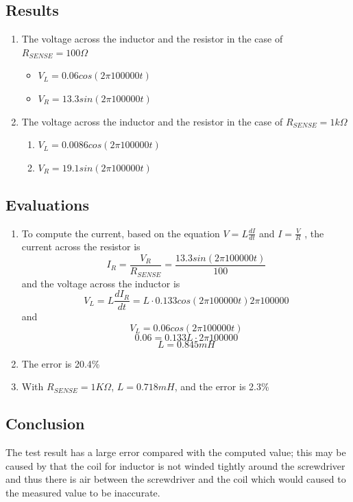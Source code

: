 \documentclass[journal, letterpaper]{IEEEtran}
\begin{document}
    \subsection{Results}
    	\begin{enumerate}
    	\item The voltage across the inductor and the resistor in the case of $R_{SENSE}=100\Omega$
    				\begin{itemize}
    				\item $V_L = 0.06cos(2\pi100000t)$
    				\item $V_R = 13.3sin(2\pi100000t)$
                    \end{itemize}
\item The voltage across the inductor and the resistor in the case of $R_{SENSE} = 1k\Omega$
		\begin{enumerate}
		\item $V_L = 0.0086cos(2\pi100000t)$
\item $V_R = 19.1sin(2\pi100000t)$
		\end{enumerate}
    \end{enumerate}

    \subsection{Evaluations}
    \begin{enumerate}
    \item To compute the current, based on the equation $V = L\frac{dI}{dt}$ and $I = \frac{V}{R}$ , the current across the resistor is $$I_R = \frac{V_R}{R_{SENSE}} = \frac{13.3sin(2\pi100000t)}{100}$$ and the voltage across the inductor is $$V_L = L\frac{dI_R}{dt} = L\cdot0.133cos(2\pi100000t)2\pi100000$$ and $$V_L = 0.06cos(2\pi100000t)$$ $$0.06 = 0.133L\cdot2\pi100000$$$$L = 0.845mH$$
\item The error is 20.4\%
\item With $R_{SENSE} = 1K\Omega$, $L = 0.718mH$, and the error is 2.3\%

    \end{enumerate}
    \subsection{Conclusion}
    The test result has a large error compared with the computed value; this may be caused by that the coil for inductor is not winded tightly around the screwdriver and thus there is air between the screwdriver and the coil which would caused to the measured value to be inaccurate. 
\end{document}
